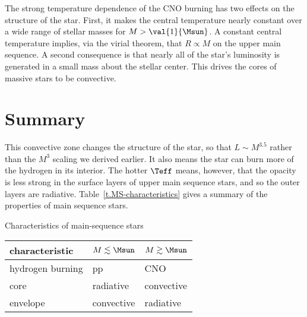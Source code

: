 The strong temperature dependence of the CNO burning has two effects on the structure of the star.  First, it makes the central temperature nearly constant over a wide range of stellar masses for $M > \val{1}{\Msun}$. A constant central temperature implies, via the virial theorem, that $R \propto M$ on the upper main sequence.  A second consequence is that nearly all of the star's luminosity is generated in a small mass about the stellar center.  This drives the cores of massive stars to be convective.

\section{Summary}

This convective zone changes the structure of the star, so that $L\sim M^{3.5}$ rather than the $M^{3}$ scaling we derived earlier.  It also means the star can burn more of the hydrogen in its interior.  The hotter $\Teff$ means, however, that the opacity is less strong in the surface layers of upper main sequence stars, and so the outer layers are radiative.  Table~\ref{t.MS-characteristics} gives a summary of the properties of main sequence stars.
\begin{margintable}[-6\baselineskip]
\caption{\label{t.MS-characteristics} Characteristics of main-sequence stars}
\centering
\begin{tabular}{lll}
characteristic & $M\lesssim\Msun$ & $M\gtrsim\Msun$\\
\hline
hydrogen burning & pp & CNO\\
core & radiative  & convective\\
envelope & convective & radiative\\
\end{tabular}
\end{margintable}
